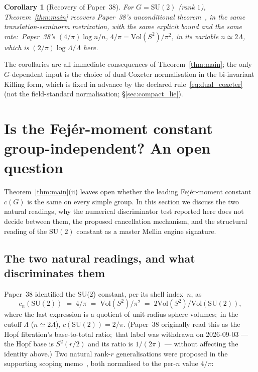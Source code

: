 \documentclass[11pt,a4paper]{article}
\theoremstyle{plain}
\newtheorem{corollary}[theorem]{Corollary}
\theoremstyle{definition}
\newcommand{\Lammax}{\Lambda}
\newcommand{\SU}{\mathrm{SU}}
\newcommand{\Vol}{\mathrm{Vol}}
\begin{document}
\begin{corollary}[Recovery of Paper~38]\label{cor:paper38_recovery}
For $G = \SU(2)$ (rank $1$), Theorem~\ref{thm:main} recovers
Paper~38's unconditional theorem~\cite{paper38}, in the same
translation-seminorm metrization, with the same explicit bound and the
same rate:\ Paper~38's $(4/\pi)\log n/n$, $4/\pi = \Vol(S^2)/\pi^2$, in
its variable $n \simeq 2\Lammax$, which is $(2/\pi)\log\Lammax/\Lammax$
here.
\end{corollary}

The corollaries are all immediate consequences of
Theorem~\ref{thm:main}; the only $G$-dependent input is the choice of
dual-Coxeter normalisation in the bi-invariant Killing form, which is
fixed in advance by the declared rule~\eqref{eq:dual_coxeter} (not the
field-standard normalisation; \S\ref{sec:compact_lie}).

\section{Is the Fej\'er-moment constant group-independent? An open question}
\label{sec:universal}

Theorem~\ref{thm:main}(ii) leaves open whether the leading
Fej\'er-moment constant $c(G)$ is the same on every simple group. In
this section we discuss the two natural readings, why the numerical
discriminator test reported here does not decide between them, the
proposed cancellation mechanism, and the structural reading of the
$\SU(2)$ constant as a master Mellin engine signature.

\subsection{The two natural readings, and what discriminates them}
\label{sec:two_readings}

Paper~38 identified the SU(2) constant, per its shell index~$n$, as
\begin{equation}\label{eq:su2_4_over_pi}
   c_n(\SU(2)) \;=\; 4/\pi
   \;=\; \Vol(S^2)/\pi^2
   \;=\; 2\Vol(S^2)/\Vol(\SU(2)),
\end{equation}
where the last expression is a quotient of unit-radius sphere volumes;\
in the cutoff $\Lammax$ ($n \simeq 2\Lammax$), $c(\SU(2)) = 2/\pi$.
(Paper~38 originally read this as the Hopf fibration's base-to-total ratio;\
that label was withdrawn on 2026-09-03 --- the Hopf base is $S^2(r/2)$ and its
ratio is $1/(2\pi)$ --- without affecting the identity above.)  Two natural
rank-$r$ generalisations
were proposed in the supporting scoping
memo~\cite{unified_gh_scoping_memo}, both normalised to the per-$n$
value $4/\pi$:
\end{document}
